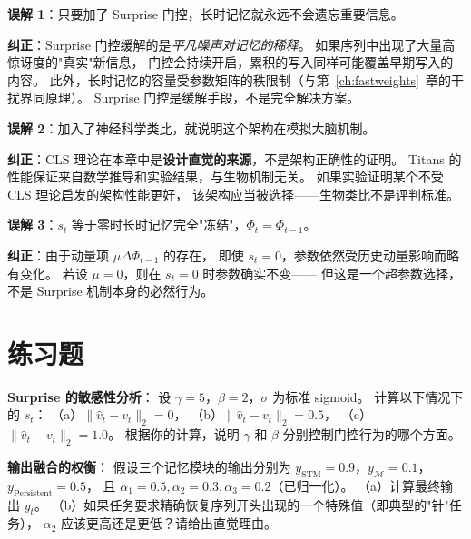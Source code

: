 \begin{misconceptionbox}
\textbf{误解 1}：只要加了 Surprise 门控，长时记忆就永远不会遗忘重要信息。

\textbf{纠正}：Surprise 门控缓解的是\textit{平凡噪声对记忆的稀释}。
如果序列中出现了大量高惊讶度的"真实"新信息，
门控会持续开启，累积的写入同样可能覆盖早期写入的内容。
此外，长时记忆的容量受参数矩阵的秩限制（与第~\ref{ch:fastweights}~章的干扰界同原理）。
Surprise 门控是缓解手段，不是完全解决方案。
\end{misconceptionbox}

\begin{misconceptionbox}
\textbf{误解 2}：加入了神经科学类比，就说明这个架构在模拟大脑机制。

\textbf{纠正}：CLS 理论在本章中是\textbf{设计直觉的来源}，不是架构正确性的证明。
Titans 的性能保证来自数学推导和实验结果，与生物机制无关。
如果实验证明某个不受 CLS 理论启发的架构性能更好，
该架构应当被选择——生物类比不是评判标准。
\end{misconceptionbox}

\begin{misconceptionbox}
\textbf{误解 3}：$s_t$ 等于零时长时记忆完全"冻结"，$\Phi_t = \Phi_{t-1}$。

\textbf{纠正}：由于动量项 $\mu \Delta\Phi_{t-1}$ 的存在，
即使 $s_t = 0$，参数依然受历史动量影响而略有变化。
若设 $\mu = 0$，则在 $s_t = 0$ 时参数确实不变——
但这是一个超参数选择，不是 Surprise 机制本身的必然行为。
\end{misconceptionbox}

\section{练习题}
\label{sec:titans_exercises}

\begin{exercise}
\textbf{Surprise 的敏感性分析}：
设 $\gamma = 5$，$\beta = 2$，$\sigma$ 为标准 sigmoid。
计算以下情况下的 $s_t$：
（a）$\|\hat{v}_t - v_t\|_2 = 0$，
（b）$\|\hat{v}_t - v_t\|_2 = 0.5$，
（c）$\|\hat{v}_t - v_t\|_2 = 1.0$。
根据你的计算，说明 $\gamma$ 和 $\beta$ 分别控制门控行为的哪个方面。
\end{exercise}

\begin{exercise}
\textbf{输出融合的权衡}：
假设三个记忆模块的输出分别为
$y_{\text{STM}} = 0.9$，$y_{\mathcal{M}} = 0.1$，$y_{\text{Persistent}} = 0.5$，
且 $\alpha_1 = 0.5, \alpha_2 = 0.3, \alpha_3 = 0.2$（已归一化）。
（a）计算最终输出 $y_t$。
（b）如果任务要求精确恢复序列开头出现的一个特殊值（即典型的"针"任务），
$\alpha_2$ 应该更高还是更低？请给出直觉理由。
\end{exercise}

